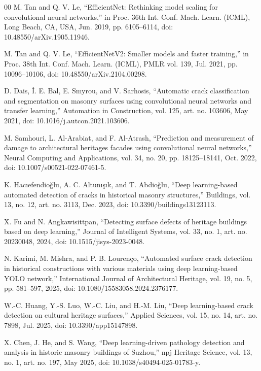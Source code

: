 \documentclass[conference]{IEEEtran}
\begin{document}
\begin{thebibliography}{00}
 M. Tan and Q. V. Le, ``EfficientNet: Rethinking model scaling for convolutional neural networks,'' in Proc. 36th Int. Conf. Mach. Learn. (ICML), Long Beach, CA, USA, Jun. 2019, pp. 6105--6114, doi: 10.48550/arXiv.1905.11946.

 M. Tan and Q. V. Le, ``EfficientNetV2: Smaller models and faster training,'' in Proc. 38th Int. Conf. Mach. Learn. (ICML), PMLR vol. 139, Jul. 2021, pp. 10096--10106, doi: 10.48550/arXiv.2104.00298.

 D. Dais, İ. E. Bal, E. Smyrou, and V. Sarhosis, ``Automatic crack classification and segmentation on masonry surfaces using convolutional neural networks and transfer learning,'' Automation in Construction, vol. 125, art. no. 103606, May 2021, doi: 10.1016/j.autcon.2021.103606.

 M. Samhouri, L. Al-Arabiat, and F. Al-Atrash, ``Prediction and measurement of damage to architectural heritages facades using convolutional neural networks,'' Neural Computing and Applications, vol. 34, no. 20, pp. 18125--18141, Oct. 2022, doi: 10.1007/s00521-022-07461-5.

 K. Hacıefendioğlu, A. C. Altunışık, and T. Abdioğlu, ``Deep learning-based automated detection of cracks in historical masonry structures,'' Buildings, vol. 13, no. 12, art. no. 3113, Dec. 2023, doi: 10.3390/buildings13123113.

 X. Fu and N. Angkawisittpan, ``Detecting surface defects of heritage buildings based on deep learning,'' Journal of Intelligent Systems, vol. 33, no. 1, art. no. 20230048, 2024, doi: 10.1515/jisys-2023-0048.

 N. Karimi, M. Mishra, and P. B. Lourenço, ``Automated surface crack detection in historical constructions with various materials using deep learning-based YOLO network,'' International Journal of Architectural Heritage, vol. 19, no. 5, pp. 581--597, 2025, doi: 10.1080/15583058.2024.2376177.

 W.-C. Huang, Y.-S. Luo, W.-C. Liu, and H.-M. Liu, ``Deep learning-based crack detection on cultural heritage surfaces,'' Applied Sciences, vol. 15, no. 14, art. no. 7898, Jul. 2025, doi: 10.3390/app15147898.

 X. Chen, J. He, and S. Wang, ``Deep learning-driven pathology detection and analysis in historic masonry buildings of Suzhou,'' npj Heritage Science, vol. 13, no. 1, art. no. 197, May 2025, doi: 10.1038/s40494-025-01783-y.


\end{thebibliography}
\end{document}
